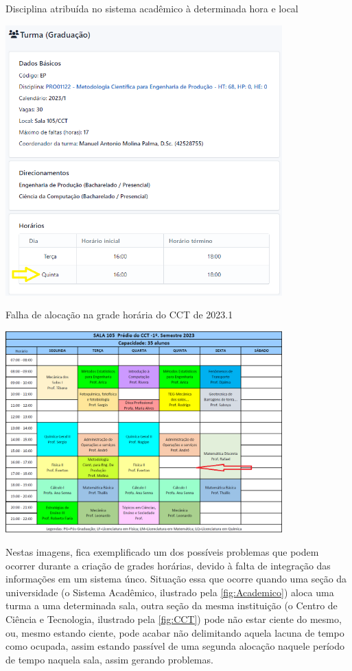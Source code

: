 \begin{MyCenteredFigure} \caption{Disciplina atribuída no sistema acadêmico à determinada hora e local} \label{fig:Academico}
  \includegraphics[width=0.8\textwidth]{files/img/2.02!2-marco/Metodologia-Quinta}
\end{MyCenteredFigure}

\begin{MyCenteredFigure} \caption{Falha de alocação na grade horária do CCT de 2023.1} \label{fig:CCT}
  \includegraphics[width=0.8\textwidth]{files/img/2.02!2-marco/Aulas-CCT-105-2023_1}
\end{MyCenteredFigure}

Nestas imagens, fica exemplificado um dos possíveis problemas que podem ocorrer durante a criação de grades horárias, devido à falta de integração das informações em um sistema únco. Situação essa que ocorre quando uma seção da universidade (o Sistema Acadêmico, ilustrado pela \autoref{fig:Academico}) aloca uma turma a uma determinada sala, outra seção da mesma instituição (o Centro de Ciência e Tecnologia, ilustrado pela \autoref{fig:CCT}) pode não estar ciente do mesmo, ou, mesmo estando ciente, pode acabar não delimitando aquela lacuna de tempo como ocupada, assim estando passível de uma segunda alocação naquele período de tempo naquela sala, assim gerando problemas.

